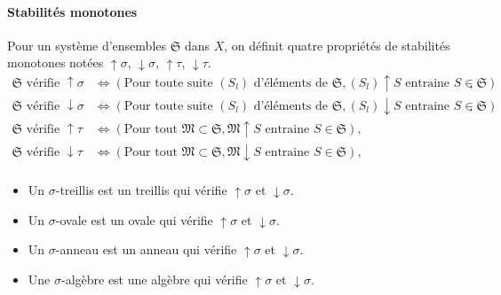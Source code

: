 \paragraph{Stabilités monotones}
\begin{defi}
Pour un système d'ensembles $\mathfrak{S}$ dans $X$, on définit quatre propriétés de stabilités monotones notées $\uparrow \sigma$, $\downarrow \sigma$, $\uparrow \tau$, $\downarrow \tau$.
\begin{align*}
 \mathfrak{S} \text{ vérifie } \uparrow \sigma &\Leftrightarrow
   \left( \text{Pour toute suite } (S_l) \text{ d'éléments de } \mathfrak{S}, (S_l)\uparrow S  \text{ entraine } S \in \mathfrak{S} \right), \\
 \mathfrak{S} \text{ vérifie } \downarrow \sigma &\Leftrightarrow
   \left( \text{Pour toute suite } (S_l) \text{ d'éléments de } \mathfrak{S}, (S_l)\downarrow S  \text{ entraine } S \in \mathfrak{S} \right), \\
 \mathfrak{S} \text{ vérifie } \uparrow \tau &\Leftrightarrow
   \left( \text{Pour tout } \mathfrak{M} \subset \mathfrak{S}, \mathfrak{M}\uparrow S  \text{ entraine } S \in \mathfrak{S} \right), \\
 \mathfrak{S} \text{ vérifie } \downarrow \tau &\Leftrightarrow
   \left( \text{Pour tout } \mathfrak{M} \subset \mathfrak{S}, \mathfrak{M}\downarrow S  \text{ entraine } S \in \mathfrak{S} \right), \\
\end{align*}
\end{defi}
  
\begin{defin}
\begin{itemize}
 \item Un $\sigma$-treillis est un treillis qui vérifie $\uparrow \sigma$ et $\downarrow \sigma$.
 \item Un $\sigma$-ovale est un ovale qui vérifie $\uparrow \sigma$ et $\downarrow \sigma$.
 \item Un $\sigma$-anneau est un anneau qui vérifie $\uparrow \sigma$ et $\downarrow \sigma$.
 \item Une $\sigma$-algèbre est une algèbre qui vérifie $\uparrow \sigma$ et $\downarrow \sigma$.
\end{itemize}
\end{defin}
